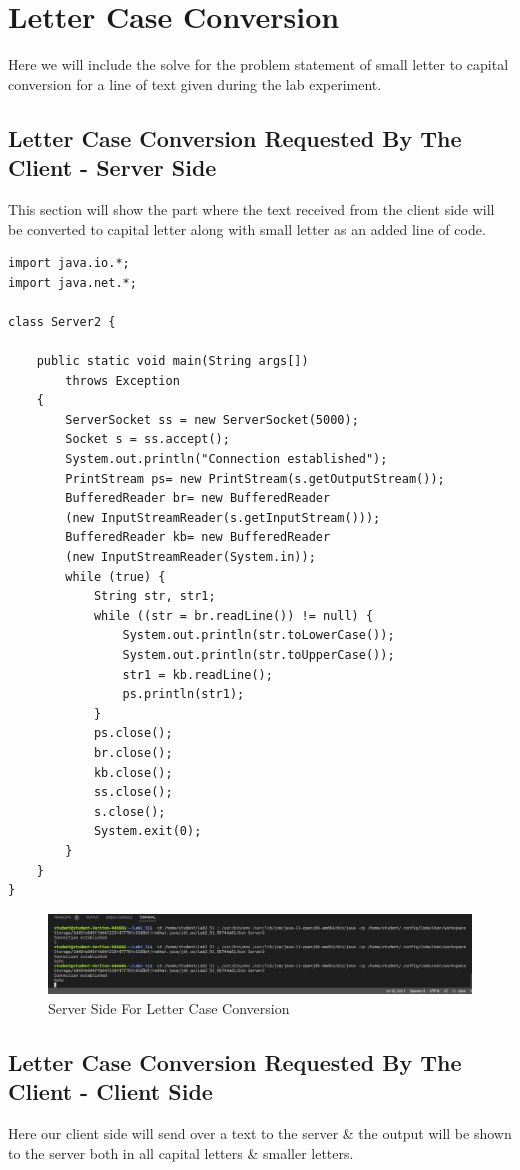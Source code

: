\documentclass[11pt]{article}
\begin{document}
\section{Letter Case Conversion}
Here we will include the solve for the problem statement of small letter to capital conversion for a line of text given during the lab experiment.
\subsection{Letter Case Conversion Requested By The Client - Server Side }
This section will show the part where the text received from the client side will be converted to capital letter along with small letter as an added line of code.

\begin{verbatim}
import java.io.*;
import java.net.*;

class Server2 {

	public static void main(String args[])
		throws Exception
	{
		ServerSocket ss = new ServerSocket(5000);
		Socket s = ss.accept();
		System.out.println("Connection established");
		PrintStream ps= new PrintStream(s.getOutputStream());
		BufferedReader br= new BufferedReader
		(new InputStreamReader(s.getInputStream()));
		BufferedReader kb= new BufferedReader
		(new InputStreamReader(System.in));
		while (true) {
			String str, str1;
			while ((str = br.readLine()) != null) {
				System.out.println(str.toLowerCase());
				System.out.println(str.toUpperCase());
				str1 = kb.readLine();
				ps.println(str1);
			}
			ps.close();
			br.close();
			kb.close();
			ss.close();
			s.close();
			System.exit(0);
		} 
	}
}

\end{verbatim}

\begin{figure}[!h]
\centering
\includegraphics[width=\textwidth]{case_server.png}
\caption{Server Side For Letter Case Conversion}
\end{figure}


\subsection{Letter Case Conversion Requested By The Client - Client Side}
Here our client side will send over a text to the server & the output will be shown to the server both in all capital letters & smaller letters. 
\end{document}
